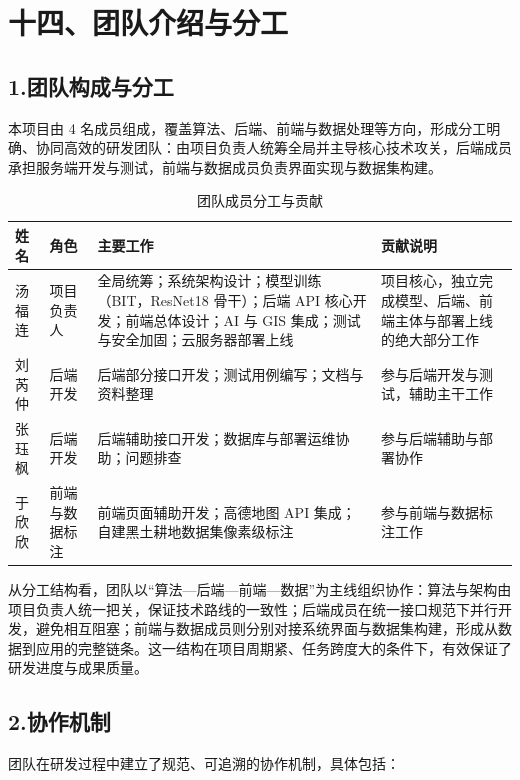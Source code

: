 \documentclass[12pt, a4paper]{ctexart}
\begin{document}
\section{十四、团队介绍与分工}

\subsection{1.团队构成与分工}

本项目由 4 名成员组成，覆盖算法、后端、前端与数据处理等方向，形成分工明确、协同高效的研发团队：由项目负责人统筹全局并主导核心技术攻关，后端成员承担服务端开发与测试，前端与数据成员负责界面实现与数据集构建。

\begin{table}[htbp]
\centering
\caption{团队成员分工与贡献}
\begin{tabular}{|p{1.9cm}|p{2.6cm}|p{6.6cm}|p{3.0cm}|}
\hline
\textbf{姓名} & \textbf{角色} & \textbf{主要工作} & \textbf{贡献说明} \\
\hline
汤福连 & 项目负责人 & 全局统筹；系统架构设计；模型训练（BIT，ResNet18 骨干）；后端 API 核心开发；前端总体设计；AI 与 GIS 集成；测试与安全加固；云服务器部署上线 & 项目核心，独立完成模型、后端、前端主体与部署上线的绝大部分工作 \\
\hline
刘芮仲 & 后端开发 & 后端部分接口开发；测试用例编写；文档与资料整理 & 参与后端开发与测试，辅助主干工作 \\
\hline
张珏枫 & 后端开发 & 后端辅助接口开发；数据库与部署运维协助；问题排查 & 参与后端辅助与部署协作 \\
\hline
于欣欣 & 前端与数据标注 & 前端页面辅助开发；高德地图 API 集成；自建黑土耕地数据集像素级标注 & 参与前端与数据标注工作 \\
\hline
\end{tabular}
\end{table}

从分工结构看，团队以“算法—后端—前端—数据”为主线组织协作：算法与架构由项目负责人统一把关，保证技术路线的一致性；后端成员在统一接口规范下并行开发，避免相互阻塞；前端与数据成员则分别对接系统界面与数据集构建，形成从数据到应用的完整链条。这一结构在项目周期紧、任务跨度大的条件下，有效保证了研发进度与成果质量。

\subsection{2.协作机制}

团队在研发过程中建立了规范、可追溯的协作机制，具体包括：
\end{document}
